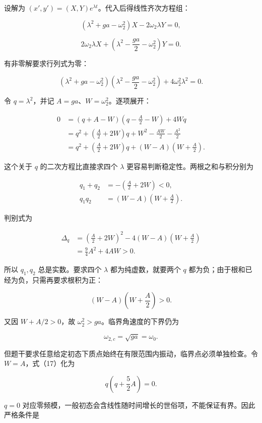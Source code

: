 \documentclass[12pt,a4paper,UTF8]{ctexart}
\begin{document}
设解为 \((x',y')=(X,Y)e^{\lambda t}\)。代入后得线性齐次方程组：

\[
(\lambda^2+ga-\omega_2^2)X-2\omega_2\lambda Y=0, \tag{15}
\]

\[
2\omega_2\lambda X+
\left(\lambda^2-\frac{ga}{2}-\omega_2^2\right)Y=0. \tag{16}
\]

有非零解要求行列式为零：

\[
(\lambda^2+ga-\omega_2^2)
\left(\lambda^2-\frac{ga}{2}-\omega_2^2\right)
+4\omega_2^2\lambda^2=0.
\]

令 \(q=\lambda^2\)，并记 \(A=ga\)、\(W=\omega_2^2\)。逐项展开：

\[
\begin{aligned}
0
&=(q+A-W)\left(q-\frac A2-W\right)+4Wq\\
&=q^2+\left(\frac A2+2W\right)q
+W^2-\frac{AW}{2}-\frac{A^2}{2}\\
&=q^2+\left(\frac A2+2W\right)q
+(W-A)\left(W+\frac A2\right).
\end{aligned}
\tag{17}
\]

这个关于 \(q\) 的二次方程比直接求四个 \(\lambda\)
更容易判断稳定性。两根之和与积分别为

\[
\begin{aligned}
q_1+q_2&=-\left(\frac A2+2W\right)<0,\\
q_1q_2&=(W-A)\left(W+\frac A2\right). 
\end{aligned}
\tag{18}
\]

判别式为

\[
\begin{aligned}
\Delta_q
&=\left(\frac A2+2W\right)^2
-4(W-A)\left(W+\frac A2\right)\\
&=\frac94A^2+4AW>0. 
\end{aligned}
\tag{19}
\]

所以 \(q_1,q_2\) 总是实数。要求四个 \(\lambda\) 都为纯虚数，就要两个
\(q\) 都为负；由于根和已经为负，只需再要求根积为正：

\[
(W-A)\left(W+\frac A2\right)>0. \tag{20}
\]

又因 \(W+A/2>0\)，故 \(\omega_2^2>ga\)。临界角速度的下界仍为

\[
\boxed{\omega_{2,c}=\sqrt{ga}=\omega_0}. \tag{21}
\]

但题干要求任意给定初态下质点始终在有限范围内振动，临界点必须单独检查。令
\(W=A\)，式（17）化为

\[
q\left(q+\frac52A\right)=0.
\]

\(q=0\)
对应零频模，一般初态会含线性随时间增长的世俗项，不能保证有界。因此严格条件是
\end{document}
